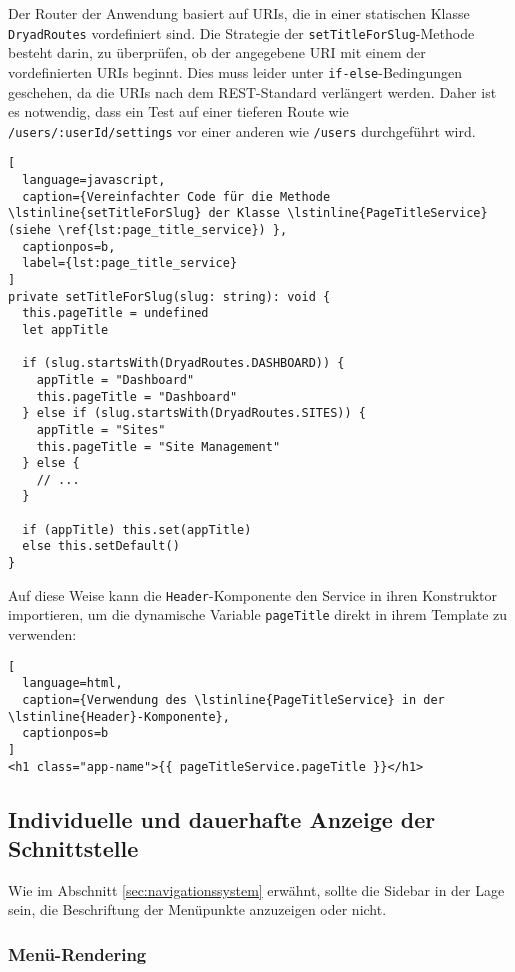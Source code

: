 Der Router der Anwendung basiert auf \ac{URI}s, die in einer statischen Klasse \lstinline{DryadRoutes} vordefiniert sind.
Die Strategie der \lstinline{setTitleForSlug}-Methode besteht darin, zu überprüfen, ob der angegebene \ac{URI} mit einem der vordefinierten \ac{URI}s beginnt.
Dies muss leider unter \lstinline{if-else}-Bedingungen geschehen, da die \ac{URI}s nach dem \ac{REST}-Standard verlängert werden.
Daher ist es notwendig, dass ein Test auf einer tieferen Route wie \lstinline{/users/:userId/settings} vor einer anderen wie \lstinline{/users} durchgeführt wird.

\begin{lstlisting}[
  language=javascript,
  caption={Vereinfachter Code für die Methode \lstinline{setTitleForSlug} der Klasse \lstinline{PageTitleService} (siehe \ref{lst:page_title_service}) },
  captionpos=b,
  label={lst:page_title_service}
]
private setTitleForSlug(slug: string): void {
  this.pageTitle = undefined
  let appTitle

  if (slug.startsWith(DryadRoutes.DASHBOARD)) {
    appTitle = "Dashboard"
    this.pageTitle = "Dashboard"
  } else if (slug.startsWith(DryadRoutes.SITES)) {
    appTitle = "Sites"
    this.pageTitle = "Site Management"
  } else {
    // ...
  }

  if (appTitle) this.set(appTitle)
  else this.setDefault()
}
\end{lstlisting}

Auf diese Weise kann die \lstinline{Header}-Komponente den Service in ihren Konstruktor importieren, um die dynamische Variable \lstinline{pageTitle} direkt in ihrem Template zu verwenden:

\begin{lstlisting}[
  language=html,
  caption={Verwendung des \lstinline{PageTitleService} in der \lstinline{Header}-Komponente},
  captionpos=b
]
<h1 class="app-name">{{ pageTitleService.pageTitle }}</h1>
\end{lstlisting}


\subsection{Individuelle und dauerhafte Anzeige der Schnittstelle}

Wie im Abschnitt \ref{sec:navigationssystem} erwähnt, sollte die Sidebar in der Lage sein, die Beschriftung der Menüpunkte anzuzeigen oder nicht.

\subsubsection{Menü-Rendering}

